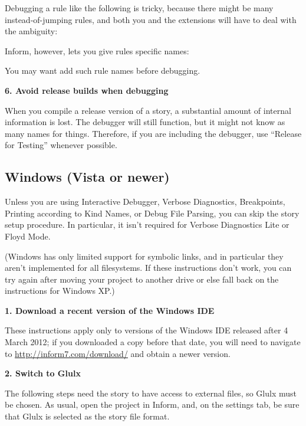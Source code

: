 \documentclass{book}
\newcommand{\lastpagebreak}{\vfill\pagebreak}
\begin{document}
Debugging a rule like the following is tricky, because there might be many
instead-of-jumping rules, and both you and the extensions will have to deal with
the ambiguity:

\begin{quote}
  
\end{quote}

Inform, however, lets you give rules specific names:

\begin{quote}
  
\end{quote}

You may want add such rule names before debugging.

\textbf{6. Avoid release builds when debugging}

When you compile a release version of a story, a substantial amount of internal
information is lost.  The debugger will still function, but it might not know as
many names for things.  Therefore, if you are including the debugger, use
``Release for Testing'' whenever possible.

\lastpagebreak

\subsection{Windows (Vista or newer)}

Unless you are using Interactive Debugger, Verbose Diagnostics, Breakpoints,
Printing according to Kind Names, or Debug File Parsing, you can skip the story
setup procedure.  In particular, it isn't required for Verbose Diagnostics Lite
or Floyd Mode.

(Windows has only limited support for symbolic links, and in particular they
aren't implemented for all filesystems.  If these instructions don't work, you
can try again after moving your project to another drive or else fall back on
the instructions for Windows XP.)

\textbf{1. Download a recent version of the Windows IDE}

These instructions apply only to versions of the Windows IDE released after 4
March 2012; if you downloaded a copy before that date, you will need to navigate
to \url{http://inform7.com/download/} and obtain a newer version.

\textbf{2. Switch to Glulx}

The following steps need the story to have access to external files, so Glulx
must be chosen.  As usual, open the project in Inform, and, on the settings tab,
be sure that Glulx is selected as the story file format.
\end{document}

